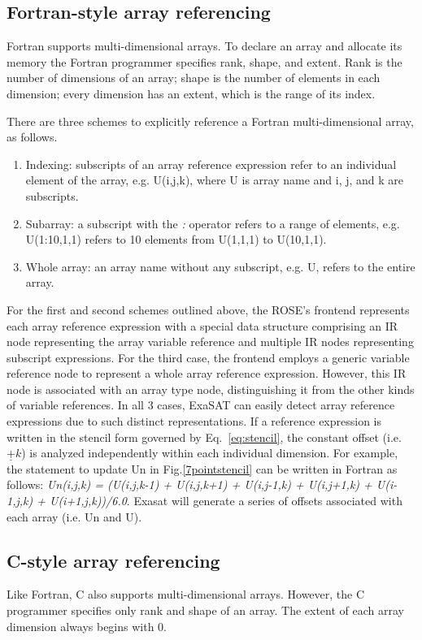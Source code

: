 \documentclass{article}
\begin{document}
\subsection{Fortran-style array referencing}
Fortran supports multi-dimensional arrays.
To declare an array and allocate its memory the Fortran programmer specifies rank, shape, and extent.
Rank is the number of dimensions of an array; shape is the number of elements in each dimension; every dimension has an extent, which is the range of its index.

There are three schemes to explicitly reference a Fortran multi-dimensional array, as follows.

\begin{enumerate}
\item Indexing: subscripts of an array reference expression refer to an individual element of the array, e.g. U(i,j,k), where U is array name and i, j, and k are subscripts. 
\item Subarray: a subscript with the {\em :} operator refers to a range of elements, e.g. U(1:10,1,1) refers to 10 elements from U(1,1,1) to U(10,1,1).  
\item Whole array: an array name without any subscript, e.g. U, refers to the entire array.
\end{enumerate}

For the first and second schemes outlined above, the ROSE's frontend represents each array reference expression with a special data structure comprising an IR node representing the array variable reference and multiple IR nodes representing subscript expressions.
For the third case, the frontend employs a generic variable reference node to represent a whole array reference expression.
However, this IR node is associated with an array type node, distinguishing it from the other kinds of variable references. 
In all 3 cases, ExaSAT can easily detect array reference expressions due to such distinct representations.
If a reference expression is written in the stencil form governed by Eq.~\ref{eq:stencil}, the constant offset (i.e. $\underline{+} k$) is analyzed independently within each individual dimension. 
For example, the statement to update Un in Fig.\ref{7pointstencil} can be written in Fortran as follows:
{\em Un(i,j,k) =  (U(i,j,k-1) + U(i,j,k+1) + U(i,j-1,k) + U(i,j+1,k) + U(i-1,j,k) + U(i+1,j,k))/6.0}.
Exasat will generate a series of offsets associated with each array (i.e. Un and U).

\subsection{C-style array referencing}
Like Fortran, C also supports multi-dimensional arrays.
However, the C programmer specifies only rank and shape of an array.
The extent of each array dimension always begins with 0.
\end{document}

